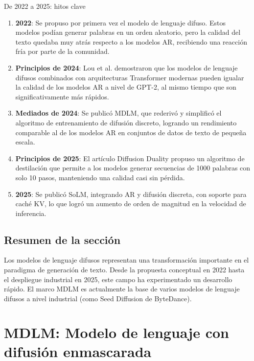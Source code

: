 \documentclass[a4paper]{article}
\begin{document}
\begin{knowledgebox}{De 2022 a 2025: hitos clave}
\begin{enumerate}
    \item \textbf{2022}: Se propuso por primera vez el modelo de lenguaje difuso. Estos modelos podían generar palabras en un orden aleatorio, pero la calidad del texto quedaba muy atrás respecto a los modelos AR, recibiendo una reacción fría por parte de la comunidad.
    \item \textbf{Principios de 2024}: Lou et al. demostraron que los modelos de lenguaje difusos combinados con arquitecturas Transformer modernas pueden igualar la calidad de los modelos AR a nivel de GPT-2, al mismo tiempo que son significativamente más rápidos.
    \item \textbf{Mediados de 2024}: Se publicó MDLM, que rederivó y simplificó el algoritmo de entrenamiento de difusión discreto, logrando un rendimiento comparable al de los modelos AR en conjuntos de datos de texto de pequeña escala.
    \item \textbf{Principios de 2025}: El artículo Diffusion Duality propuso un algoritmo de destilación que permite a los modelos generar secuencias de 1000 palabras con solo 10 pasos, manteniendo una calidad casi sin pérdida.
    \item \textbf{2025}: Se publicó SoLM, integrando AR y difusión discreta, con soporte para caché KV, lo que logró un aumento de orden de magnitud en la velocidad de inferencia.
\end{enumerate}
\end{knowledgebox}

\subsection{Resumen de la sección}

Los modelos de lenguaje difusos representan una transformación importante en el paradigma de generación de texto. Desde la propuesta conceptual en 2022 hasta el despliegue industrial en 2025, este campo ha experimentado un desarrollo rápido. El marco MDLM es actualmente la base de varios modelos de lenguaje difusos a nivel industrial (como Seed Diffusion de ByteDance).

\newpage
\section{MDLM: Modelo de lenguaje con difusión enmascarada}
\end{document}
